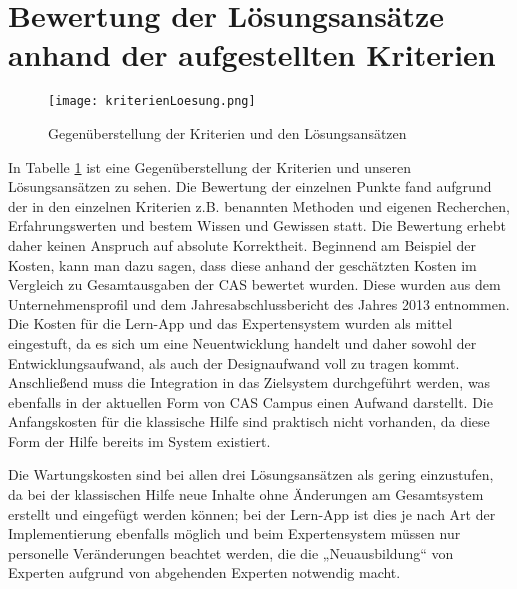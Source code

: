\section{Bewertung der Lösungsansätze anhand der aufgestellten Kriterien}
\begin{figure}[ht]
\begin{center}
\texttt{[image: kriterienLoesung.png]}
\caption{Gegenüberstellung der Kriterien und den Lösungsansätzen}
\label{img1:table2}
\end{center}
\end{figure} 
In Tabelle \ref{img1:table2} ist eine Gegenüberstellung der Kriterien und unseren Lösungsansätzen zu sehen. Die Bewertung der einzelnen Punkte fand aufgrund der in den einzelnen Kriterien z.B. benannten Methoden und eigenen Recherchen, Erfahrungswerten und bestem Wissen und Gewissen statt. Die Bewertung erhebt daher keinen Anspruch auf absolute Korrektheit. Beginnend am Beispiel der Kosten, kann man dazu sagen, dass diese anhand der geschätzten Kosten im Vergleich zu Gesamtausgaben der CAS bewertet wurden. Diese wurden aus dem Unternehmensprofil und dem Jahresabschlussbericht des Jahres 2013 entnommen. Die Kosten für die Lern-App und das Expertensystem wurden als mittel eingestuft, da es sich um eine Neuentwicklung handelt und daher sowohl der Entwicklungsaufwand, als auch der Designaufwand voll zu tragen kommt. Anschließend muss die Integration in das Zielsystem durchgeführt werden, was ebenfalls in der aktuellen Form von CAS Campus einen Aufwand darstellt. Die Anfangskosten für die klassische Hilfe sind praktisch nicht vorhanden, da diese Form der Hilfe bereits im System existiert. \par
Die Wartungskosten sind bei allen drei Lösungsansätzen als gering einzustufen, da bei der klassischen Hilfe neue Inhalte ohne Änderungen am Gesamtsystem erstellt und eingefügt werden können; bei der Lern-App ist dies je nach Art der Implementierung ebenfalls möglich und beim Expertensystem müssen nur personelle Veränderungen beachtet werden, die die „Neuausbildung“ von Experten aufgrund von abgehenden Experten notwendig macht. \par

